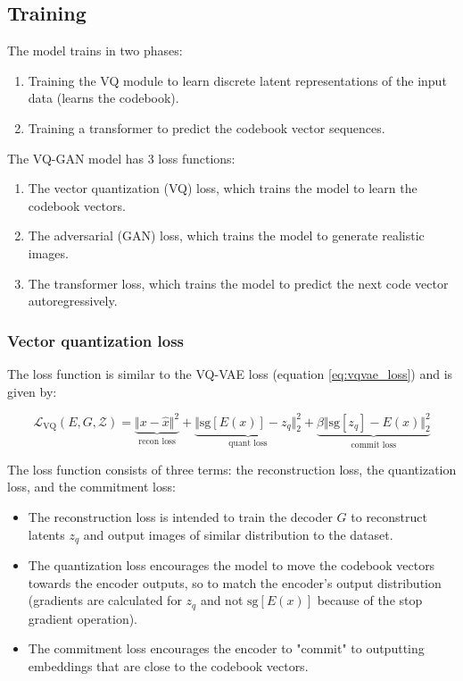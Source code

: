 \subsection{Training}

The model trains in two phases:

\begin{enumerate}
    \item Training the VQ module to learn discrete latent representations of the input data (learns the codebook).
    \item Training a transformer to predict the codebook vector sequences.
\end{enumerate}

The VQ-GAN model has 3 loss functions:

\begin{enumerate}
    \item The vector quantization (VQ) loss, which trains the model to learn the codebook vectors.
    \item The adversarial (GAN) loss, which trains the model to generate realistic images.
    \item The transformer loss, which trains the model to predict the next code vector autoregressively.
\end{enumerate}



\subsubsection*{Vector quantization loss}

The loss function is similar to the VQ-VAE loss (equation \ref{eq:vqvae_loss}) and is given by:

\begin{equation*}
    \mathcal{L}_{\text{VQ}} (E, G, \mathcal{Z}) = 
    \underbrace{\Vert x - \hat{x} \Vert ^2}_{\text{recon loss}} + 
    \underbrace{\Vert \text{sg}[E(x)] - z_q \Vert ^2_2}_{\text{quant loss}} + 
    \underbrace{\beta \Vert \text{sg}[z_q] - E(x) \Vert ^2_2}_{\text{commit loss}}
\end{equation*}

The loss function consists of three terms: the reconstruction loss, the quantization loss, and the commitment loss:

\begin{itemize}
    \item The reconstruction loss is intended to train the decoder $G$ to reconstruct latents $z_q$ and output images of similar distribution to the dataset.
    \item The quantization loss encourages the model to move the codebook vectors towards the encoder outputs, so to match the encoder's output distribution (gradients are calculated for $z_q$ and not $\text{sg}[E(x)]$ because of the stop gradient operation). 
    \item The commitment loss encourages the encoder to "commit" to outputting embeddings that are close to the codebook vectors.
\end{itemize}

